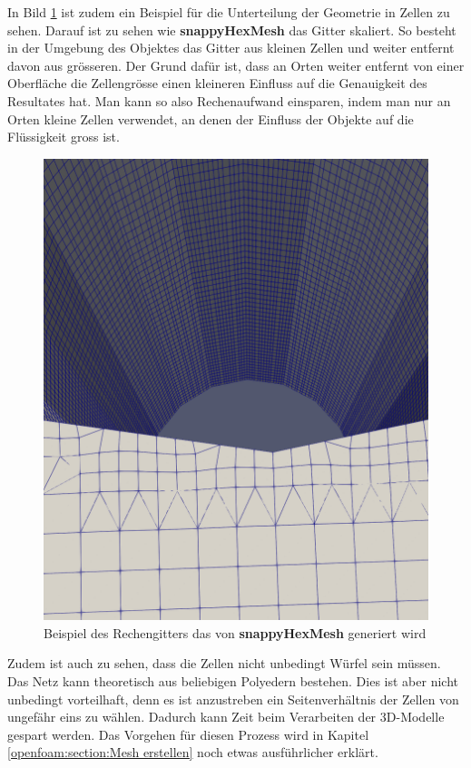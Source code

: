 In Bild \ref{openfoam:fig:sim_grid} ist zudem ein Beispiel für die Unterteilung der Geometrie in Zellen zu sehen.
Darauf ist zu sehen wie \textbf{snappyHexMesh} das Gitter skaliert.
So besteht in der Umgebung des Objektes das Gitter aus kleinen Zellen und weiter entfernt davon aus grösseren.
Der Grund dafür ist, dass an Orten weiter entfernt von einer Oberfläche die Zellengrösse einen kleineren Einfluss auf die Genauigkeit des Resultates hat.
Man kann so also Rechenaufwand einsparen, indem man nur an Orten kleine Zellen verwendet, an denen der Einfluss der Objekte auf die Flüssigkeit gross ist.
\begin{figure}
	\centering
	\includegraphics[scale=0.1]{papers/openfoam/Bilder/grid.png }
	\caption{Beispiel des Rechengitters das von \textbf{snappyHexMesh} generiert wird}
	\label{openfoam:fig:sim_grid}
\end{figure}
Zudem ist auch zu sehen, dass die Zellen nicht unbedingt Würfel sein müssen.
Das Netz kann theoretisch aus beliebigen Polyedern bestehen.
Dies ist aber nicht unbedingt vorteilhaft, denn es ist anzustreben ein Seitenverhältnis der Zellen von ungefähr eins zu wählen. 
Dadurch kann Zeit beim Verarbeiten der 3D-Modelle gespart werden.
Das Vorgehen für diesen Prozess wird in Kapitel \ref{openfoam:section:Mesh erstellen} noch etwas ausführlicher erklärt.
